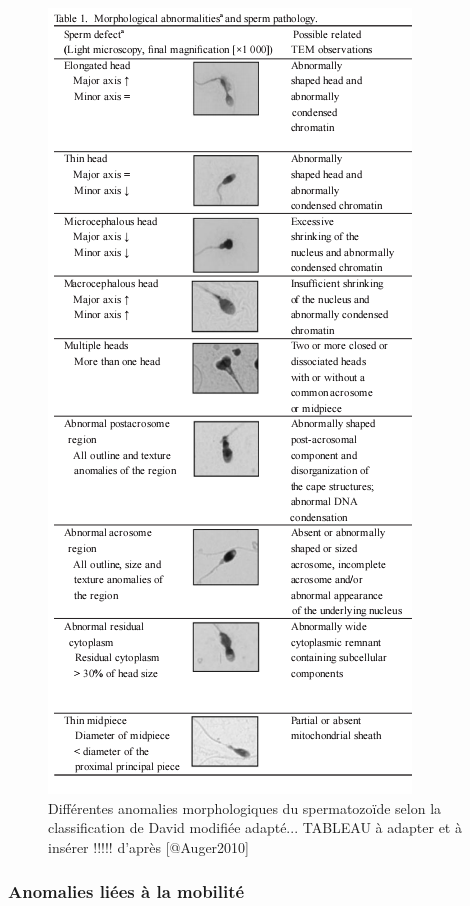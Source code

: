 \documentclass[12pt,twoside]{reedthesis}
\theoremstyle{definition}
\theoremstyle{definition}
\theoremstyle{remark}
\begin{document}
  \begin{figure}
  
  {\centering \includegraphics[scale=.75]{figure/sperm_morpho_abnormalities} 
  
  }
  
  \caption[Différentes anomalies morphologiques du spermatozoïde selon la classification de David modifiée adapté... TABLEAU à adapter et à insérer !!!!!]{Différentes anomalies morphologiques du spermatozoïde selon la classification de David modifiée adapté... TABLEAU à adapter et à insérer !!!!! d'après [@Auger2010]}\label{fig:anomaliemorphosperm}
  \end{figure}
  
  \subsubsection{Anomalies liées à la
  mobilité}\label{anomalies-liees-a-la-mobilite}
  
\end{document}
